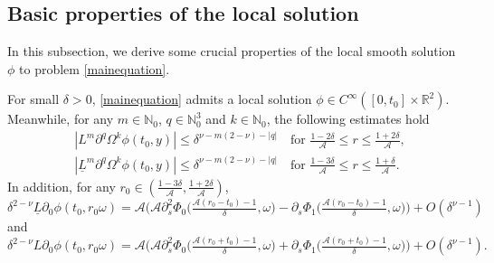 \documentclass[11pt,twoside]{article}
\begin{document}
\subsection{Basic properties of the local solution}\label{Section 2-1}
In this subsection, we derive some crucial properties of the local smooth solution $\phi$ to problem \eqref{mainequation}.


\begin{theorem}\label{Local}
For small $\delta > 0$, \eqref{mainequation} admits a local solution $\phi \in C^{\infty}([0, t_0] \times \mathbb{R}^2)$.
Meanwhile, for any $m \in \mathbb{N}_0$, $q \in \mathbb{N}_0^3$ and $k \in \mathbb{N}_0$, the following estimates hold
\begin{align}
&|L^m \partial^q \Omega^k \phi(t_0, y)|
\leq \delta^{\nu-m(2-\nu)-|q|} \quad \text{for } \frac{1 - 2\delta}{\mathcal{A}} \leq r \leq \frac{1 + 2\delta}{\mathcal{A}},\label{initial1}\\
&|\underline L^m \partial^q \Omega^k \phi(t_0, y)|
\leq \delta^{\nu-m(2-\nu)-|q|} \quad \text{for } \frac{1 - 3\delta}{\mathcal{A}} \leq r \leq \frac{1 + \delta}{\mathcal{A}}.\label{initial2}
\end{align}
In addition, for any $r_0\in (\frac{1-3\delta}{\mathcal A}, \frac{1+2\delta}{\mathcal A})$,
\begin{equation}\label{y0}
\delta^{2-\nu}\underline L\partial_{0}\phi(t_0, r_0\omega)=\mathcal{A} \big(\mathcal A\partial_s^2\Phi_0\big(\tfrac{\mathcal A(r_0-t_0)-1}{\delta}, \omega\big)-\partial_s\Phi_1\big(\tfrac{\mathcal A(r_0-t_0)-1}{\delta}, \omega\big)\big)+ O(\delta^{\nu-1})
\end{equation}
and
\begin{equation}\label{y1}
\delta^{2-\nu}L\partial_{0}\phi(t_0, r_0\omega)=\mathcal{A} \big(\mathcal A\partial_s^2\Phi_0\big(\tfrac{\mathcal A(r_0+t_0)-1}{\delta}, \omega\big)+\partial_s\Phi_1\big(\tfrac{\mathcal A(r_0+t_0)-1}{\delta}, \omega\big)\big)+ O(\delta^{\nu-1}).
\end{equation}
\end{theorem}
\end{document}
